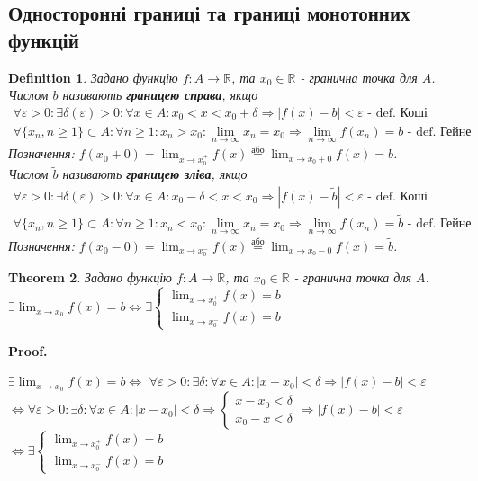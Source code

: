 \documentclass[a4paper, 14pt]{article}
\makeatletter
\def\huge{\displaystyle}
\def\qed{$\blacksquare$}
\theoremstyle{theoremdd}
\newtheorem{theorem}{Theorem}[subsection]
\theoremstyle{theoremdd}
\newtheorem{definition}[theorem]{Definition}
\theoremstyle{theoremdd}
\theoremstyle{theoremdd}
\theoremstyle{theoremdd}
\theoremstyle{theoremdd}
\theoremstyle{theoremdd}
\theoremstyle{theoremdd}
\renewenvironment{proof}[1][Proof.\\]{\par
\pushQED{\hfill \qed}%
\normalfont \topsep6\p@\@plus6\p@\relax
\trivlist
\item\relax
{\bfseries
#1\@addpunct{.}}\hspace\labelsep\ignorespaces
}{%
\popQED\endtrivlist\@endpefalse
}
\makeatother
\begin{document}
\subsection{Односторонні границі та границі монотонних функцій}
\begin{definition}
Задано функцію $f: A \to \mathbb{R}$, та $x_0 \in \mathbb{R}$ - гранична точка для $A$.\\
Числом $b$ називають \textbf{границею справа}, якщо
\begin{align*}
\forall \varepsilon > 0: \exists \delta(\varepsilon)>0: \forall x \in A: x_0<x<x_0+\delta \Rightarrow |f(x)-b|<\varepsilon \textrm{ - def. Коші}\\
\forall \{x_n,n\geq 1\} \subset A: \forall n \geq 1: x_n > x_0: \lim_{n \to \infty}x_n = x_0 \Rightarrow \lim_{n \to \infty}f(x_n) = b \textrm{ - def. Гейне}
\end{align*}
Позначення: $\huge f(x_0+0) = \lim_{x \to x_0^+} f(x) \overset{\text{або}}{=} \lim_{x \to x_0+0} f(x) = b$.\\
Числом $\tilde{b}$ називають \textbf{границею зліва}, якщо
\begin{align*}
\forall \varepsilon > 0: \exists \delta(\varepsilon)>0: \forall x \in A:  x_0-\delta<x<x_0 \Rightarrow |f(x)-\tilde{b}|<\varepsilon \textrm{ - def. Коші}\\
\forall \{x_n,n\geq 1\} \subset A: \forall n \geq 1: x_n < x_0: \lim_{n \to \infty}x_n = x_0 \Rightarrow \lim_{n \to \infty}f(x_n) = \tilde{b} \textrm{ - def. Гейне}
\end{align*}
Позначення: $\huge f(x_0-0) = \lim_{x \to x_0^-} f(x) \overset{\text{або}}{=} \lim_{x \to x_0-0} f(x) = \tilde{b}$.
\end{definition}

\begin{theorem}
Задано функцію $f: A \to \mathbb{R}$, та $x_0 \in \mathbb{R}$ - гранична точка для $A$.\\
$\exists \huge \lim_{x \to x_0} f(x) = b \iff \exists \begin{cases} \huge \lim_{x \to x_0^+} f(x) = b \\ \huge \lim_{x \to x_0^-} f(x) = b \end{cases}$
\end{theorem}

\begin{proof}
$\exists \huge \lim_{x \to x_0} f(x) = b \iff$
$\forall \varepsilon > 0: \exists \delta: \forall x \in A: |x-x_0|<\delta \Rightarrow |f(x)-b|<\varepsilon$\\
$\iff \forall \varepsilon > 0: \exists \delta: \forall x \in A: |x-x_0|<\delta \Rightarrow \begin{cases} x-x_0<\delta \\ x_0-x<\delta \end{cases} \Rightarrow |f(x)-b|<\varepsilon$ \\ $\iff \exists \begin{cases} \huge \lim_{x \to x_0^+} f(x) = b \\ \huge \lim_{x \to x_0^-} f(x) = b \end{cases}$
\end{proof}
\end{document}
